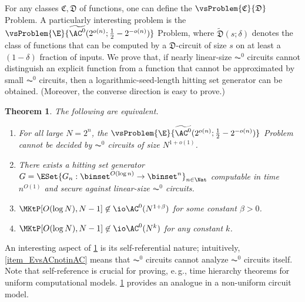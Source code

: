 \documentclass[11pt]{article}
\numberwithin{equation}{section}
\newtheorem{theorem}{Theorem}[section]
\theoremstyle{definition}
\theoremstyle{plain}
\newcommand{\eg}{e.\,g.}
\begin{document}
For any classes $\mathfrak{C}, \mathfrak{D}$ of functions,
one can define the $\vsProblem{\mathfrak{C}}{\mathfrak{D}}$ Problem.
A particularly interesting problem is
the $\vsProblem{\E}{\widetilde{\AC^0}(2^{o(n)}; \frac{1}{2} - 2^{- o(n)})}$ Problem,
where $\widetilde{\mathfrak{D}}(s; \delta)$
denotes the class of functions that can be computed by a $\mathfrak{D}$-circuit of size $s$
on at least a $(1 - \delta)$ fraction of inputs.
We prove
that, if nearly linear-size $\AC^0$ circuits cannot distinguish
an explicit function from a function that cannot be approximated by small
$\AC^0$ circuits,
then
a logarithmic-seed-length hitting set generator can be obtained.
(Moreover, the converse direction is easy to prove.)


\begin{theorem}
  \label{thm_ACEquiv}
  The following are equivalent.
  \begin{enumerate}
    \item
          \label{item_EvsACnotinAC}
          For all large $N = 2^n$,
          the $\vsProblem{\E}{\widetilde{\AC^0} (2^{o( n)} ; \frac{1}{2} - 2^{- o(n)})}$ Problem
          cannot be decided by $\AC^0$ circuits of size $N^{1 + o(1)}$.
    \item
          \label{item_AC0HSG}
          There exists a hitting set generator $G = \ESet{ G_n : \binset^{O(\log n)} \to \binset^n }_{n \in \Nat} $ computable in time $n^{O(1)}$ and secure against linear-size $\AC^0$ circuits.
    \item
          \label{item_MKtPnotinlinearAC}
          $\MKtP[O(\log N), N - 1] \not\in \io \AC^0(N^{1 + \beta})$ for some constant $\beta > 0$.
    \item
          \label{item_MKtPnotinAC}
          $\MKtP[O(\log N), N - 1] \not\in \io \AC^0(N^{k})$ for any constant $k$.
  \end{enumerate}
\end{theorem}


%
%
%
%
%
%
%
%
%
%
%
%
%

An interesting aspect of \cref{thm_ACEquiv} is its self-referential nature; intuitively, \cref{item_EvsACnotinAC} means that $\AC^0$ circuits cannot
analyze $\AC^0$ circuits itself.  Note that self-reference is crucial for proving, \eg, time hierarchy theorems for uniform computational models.  \cref{thm_ACEquiv} provides an analogue in a non-uniform circuit model.
\end{document}
